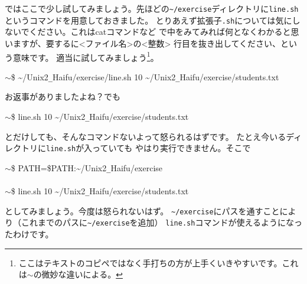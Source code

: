 \documentclass[a4j]{ltjreport}
\begin{document}
    ではここで少し試してみましょう。先ほどの\verb+~/exercise+ディレクトリに\verb+line.sh+というコマンドを用意しておきました。
    とりあえず拡張子\verb+.sh+については気にしないでください。これはcatコマンドなど
    で中をみてみれば何となくわかると思いますが、要するに<ファイル名>の<整数>
    行目を抜き出してください、という意味です。
    適当に試してみましょう\footnote{ここはテキストのコピペではなく手打ちの方が上手くいきやすいです。これは$\sim$の微妙な違いによる。}。
    \begin{screen}
        $\sim$\$ \textasciitilde/Unix2\verb+_+Haifu/exercise/line.sh 10  \textasciitilde/Unix2\verb+_+Haifu/exercise/students.txt
    \end{screen}
    お返事がありましたよね？でも
    \begin{screen}
        $\sim$\$ line.sh 10  \textasciitilde/Unix2\verb+_+Haifu/exercise/students.txt
    \end{screen}
    とだけしても、そんなコマンドないよって怒られるはずです。
    たとえ今いるディレクトリに\verb+line.sh+が入っていても
    やはり実行できません。そこで
    \begin{screen}
        $\sim$\$ PATH=\$PATH:\textasciitilde/Unix2\verb+_+Haifu/exercise\\
        \\
        $\sim$\$ line.sh 10  \textasciitilde/Unix2\verb+_+Haifu/exercise/students.txt
    \end{screen}
    としてみましょう。今度は怒られないはず。
    \verb+~/exercise+にパスを通すことにより（これまでのパスに\verb+~/exercise+を追加）
    \verb+line.sh+コマンドが使えるようになったわけです。
\end{document}
